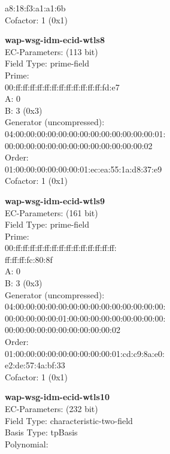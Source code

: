     a8:18:f3:a1:a1:6b\\
Cofactor:  1 (0x1)\\
\item \textbf{ wap-wsg-idm-ecid-wtls8 }\\
EC-Parameters: (113 bit)\\
Field Type: prime-field\\
Prime:\\
    00:ff:ff:ff:ff:ff:ff:ff:ff:ff:ff:ff:ff:fd:e7\\
A:    0\\
B:    3 (0x3)\\
Generator (uncompressed):\\
    04:00:00:00:00:00:00:00:00:00:00:00:00:00:01:\\
    00:00:00:00:00:00:00:00:00:00:00:00:00:02\\
Order: \\
    01:00:00:00:00:00:00:01:ec:ea:55:1a:d8:37:e9\\
Cofactor:  1 (0x1)\\
\item \textbf{ wap-wsg-idm-ecid-wtls9 }\\
EC-Parameters: (161 bit)\\
Field Type: prime-field\\
Prime:\\
    00:ff:ff:ff:ff:ff:ff:ff:ff:ff:ff:ff:ff:ff:ff:\\
    ff:ff:ff:fc:80:8f\\
A:    0\\
B:    3 (0x3)\\
Generator (uncompressed):\\
    04:00:00:00:00:00:00:00:00:00:00:00:00:00:00:\\
    00:00:00:00:00:01:00:00:00:00:00:00:00:00:00:\\
    00:00:00:00:00:00:00:00:00:00:02\\
Order: \\
    01:00:00:00:00:00:00:00:00:00:01:cd:c9:8a:e0:\\
    e2:de:57:4a:bf:33\\
Cofactor:  1 (0x1)\\
\item \textbf{ wap-wsg-idm-ecid-wtls10 }\\
EC-Parameters: (232 bit)\\
Field Type: characteristic-two-field\\
Basis Type: tpBasis\\
Polynomial:\\
